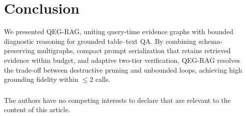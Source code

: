 \documentclass[runningheads]{llncs}
\begin{document}
\vspace{-2.5mm}
\section{Conclusion}
\label{sec:conclusion}
\vspace{-1mm}
We presented QEG-RAG, uniting query-time evidence graphs with bounded diagnostic reasoning for grounded table--text QA. By combining schema-preserving multigraphs, compact prompt serialization that retains retrieved evidence within budget, and adaptive two-tier verification, QEG-RAG resolves the trade-off between destructive pruning and unbounded loops, achieving high grounding fidelity within $\le 2$ calls.

\vspace{-3mm}
\begin{credits}
\subsubsection{\discintname}
The authors have no competing interests to declare that are relevant to the content of this article.
\end{credits}

\makeatletter
\renewenvironment{thebibliography}[1]
     {\section*{\refname}%
      \enlargethispage{2.5\baselineskip}%
      \def\@biblabel##1{##1.}%
      \fontsize{8.5pt}{9.4pt}\selectfont
      \list{\@biblabel{\@arabic\c@enumiv}}%
           {\settowidth\labelwidth{\@biblabel{#1}}%
            \leftmargin\labelwidth
            \advance\leftmargin\labelsep
            \setlength{\itemsep}{0pt}%
            \setlength{\parsep}{0pt}%
            \usecounter{enumiv}%
            \let\p@enumiv\@empty
            \renewcommand\theenumiv{\@arabic\c@enumiv}}%
      \renewcommand\newblock{\hskip .11em \@plus.33em \@minus.07em}%
      \sloppy\clubpenalty4000\widowpenalty4000%
      \sfcode`\.=1000\relax}
     {\def\@noitemerr
       {\@latex@warning{Empty `thebibliography' environment}}%
      \endlist}
\makeatother


\end{document}
